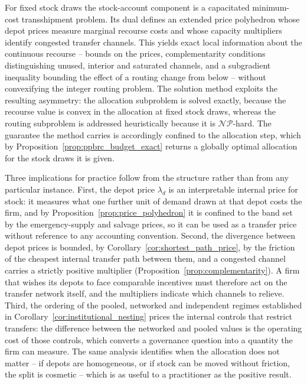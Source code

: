 \documentclass[authoryear,final,3p,times]{elsarticle}
\theoremstyle{definition}
\theoremstyle{plain}
\begin{document}
For fixed stock draws the stock-account component is a capacitated
minimum-cost transshipment problem. Its dual defines an extended price
polyhedron whose depot prices measure marginal recourse costs and whose
capacity multipliers identify congested transfer channels. This yields exact
local information about the continuous recourse -- bounds on the prices,
complementarity conditions distinguishing unused, interior and saturated
channels, and a subgradient inequality bounding the effect of a routing
change from below -- without convexifying the integer routing problem. The
solution method exploits the resulting asymmetry: the allocation subproblem is
solved exactly, because the recourse value is convex in the allocation at fixed
stock draws, whereas the routing subproblem is addressed heuristically because
it is $\mathcal{NP}$-hard. The guarantee the method carries is accordingly
confined to the allocation step, which by
Proposition~\ref{prop:ppbrc_budget_exact} returns a globally optimal
allocation for the stock draws it is given.

Three implications for practice follow from the structure rather than from
any particular instance. First, the depot price $\lambda_d$ is an
interpretable internal price for stock: it measures what one further unit of
demand drawn at that depot costs the firm, and by
Proposition~\ref{prop:price_polyhedron} it is confined to the band set by the
emergency-supply and salvage prices, so it can be used as a transfer price
without reference to any accounting convention. Second, the divergence
between depot prices is bounded, by
Corollary~\ref{cor:shortest_path_price}, by the friction of the cheapest
internal transfer path between them, and a congested channel carries a
strictly positive multiplier
(Proposition~\ref{prop:complementarity}). A firm that wishes its depots to face comparable
incentives must therefore act on the transfer network itself, and the
multipliers indicate which channels to relieve. Third, the ordering of the
pooled, networked and independent regimes established in
Corollary~\ref{cor:institutional_nesting} prices the internal controls that
restrict transfers: the difference between the networked and pooled values is
the operating cost of those controls, which converts a governance question
into a quantity the firm can measure. The same analysis identifies when
the allocation does not matter -- if depots are homogeneous, or if stock can
be moved without friction, the split is cosmetic -- which is as useful to a
practitioner as the positive result.
\end{document}
